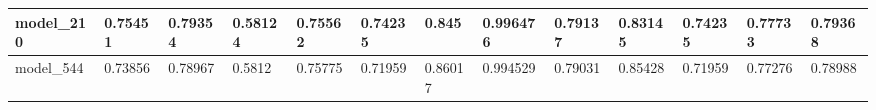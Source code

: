 \begin{tabular}{|l|l|l|l|l|l|l|l|l|l|l|l|l|}
model\_210     & 0.75451     & 0.79354        & 0.58124      & 0.75562          & 0.74235              & 0.845                & 0.996476     & 0.79137           & 0.83145            & 0.74235         & 0.77733     & 0.79368      \\ \hline
model\_544     & 0.73856     & 0.78967        & 0.5812       & 0.75775          & 0.71959              & 0.86017              & 0.994529     & 0.79031           & 0.85428            & 0.71959         & 0.77276     & 0.78988      \\ \hline
\end{tabular}
